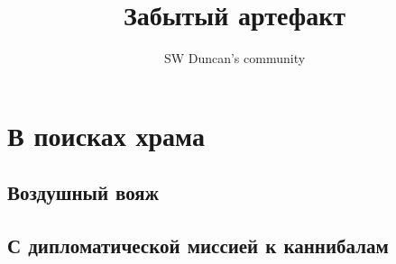 \documentclass[11pt]{article} %
\title{Забытый артефакт}
\author{SW Duncan's community}
\begin{document}
\maketitle %
\newpage
\tableofcontents %
\newpage
\section{В поисках храма}
\begin{myquote}

\end{myquote}
\subsection{Воздушный вояж}
\begin{myquote}

\end{myquote}


\begin{myquote}

\end{myquote}
\subsection{С дипломатической миссией к каннибалам}
\begin{myquote}

\end{myquote}

\begin{myquote}

\end{myquote}

\begin{myquote}

\end{myquote}

\begin{myquote}

\end{myquote}
\end{document}
